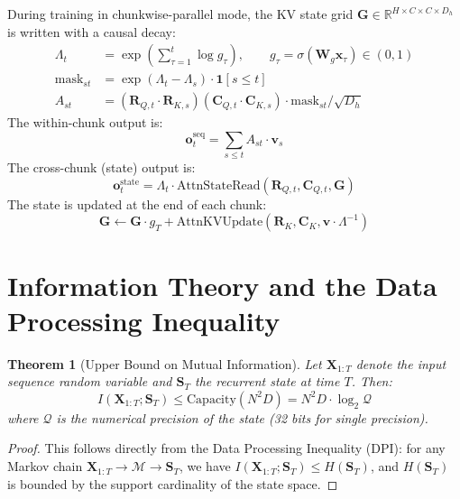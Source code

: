 \documentclass[11pt]{article}
\newtheorem{theorem}{Theorem}[section]
\begin{document}
During training in chunkwise-parallel mode, the KV state grid $\mathbf{G} \in \mathbb{R}^{H \times C \times C \times D_h}$ is written with a causal decay:
\begin{align}
    \Lambda_{t} &= \exp\!\left(\sum_{\tau=1}^t \log g_\tau\right), \qquad g_\tau = \sigma(\mathbf{W}_g \mathbf{x}_\tau) \in (0,1) \label{eq:decay_prefix} \\
    \mathrm{mask}_{st} &= \exp\!\left(\Lambda_t - \Lambda_s\right) \cdot \mathbf{1}[s \leq t] \label{eq:decay_mask} \\
    A_{st} &= \left(\mathbf{R}_{Q,t} \cdot \mathbf{R}_{K,s}\right)\!\left(\mathbf{C}_{Q,t} \cdot \mathbf{C}_{K,s}\right) \cdot \mathrm{mask}_{st} / \sqrt{D_h}
\end{align}
The within-chunk output is:
\begin{equation}
    \mathbf{o}^{\mathrm{seq}}_t = \sum_{s \leq t} A_{st} \cdot \mathbf{v}_s
\end{equation}
The cross-chunk (state) output is:
\begin{equation}
    \mathbf{o}^{\mathrm{state}}_t = \Lambda_t \cdot \mathrm{AttnStateRead}(\mathbf{R}_{Q,t}, \mathbf{C}_{Q,t}, \mathbf{G})
\end{equation}
The state is updated at the end of each chunk:
\begin{equation}
    \mathbf{G} \leftarrow \mathbf{G} \cdot g_T + \mathrm{AttnKVUpdate}(\mathbf{R}_K, \mathbf{C}_K, \mathbf{v} \cdot \Lambda^{-1})
\end{equation}

\section{Information Theory and the Data Processing Inequality}

\begin{theorem}[Upper Bound on Mutual Information]
Let $\mathbf{X}_{1:T}$ denote the input sequence random variable and $\mathbf{S}_T$ the recurrent state at time $T$. Then:
\begin{equation}
    I(\mathbf{X}_{1:T}; \mathbf{S}_T) \leq \mathrm{Capacity}(N^2 D) = N^2 D \cdot \log_2 \mathcal{Q}
\end{equation}
where $\mathcal{Q}$ is the numerical precision of the state (32 bits for single precision).
\end{theorem}
\begin{proof}
This follows directly from the Data Processing Inequality (DPI): for any Markov chain $\mathbf{X}_{1:T} \to \mathcal{M} \to \mathbf{S}_T$, we have $I(\mathbf{X}_{1:T};\mathbf{S}_T) \leq H(\mathbf{S}_T)$, and $H(\mathbf{S}_T)$ is bounded by the support cardinality of the state space.
\end{proof}
\end{document}
